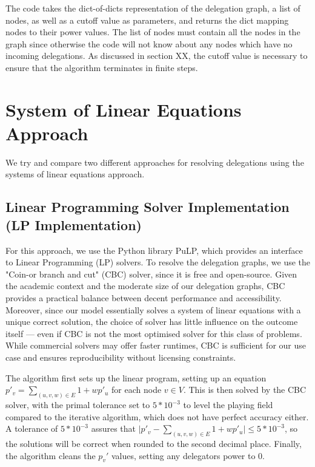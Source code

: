 The code takes the dict-of-dicts representation of the delegation graph, a list of nodes, as well as a cutoff value as parameters, and returns the dict mapping nodes to their power values. The list of nodes must contain all the nodes in the graph since otherwise the code will not know about any nodes which have no incoming delegations. As discussed in section XX, the cutoff value is necessary to ensure that the algorithm terminates in finite steps.

\section{System of Linear Equations Approach}

We try and compare two different approaches for resolving delegations using the systems of linear equations approach.

\subsection{Linear Programming Solver Implementation (LP Implementation)}

For this approach, we use the Python library PuLP, which provides an interface to Linear Programming (LP) solvers.  To resolve the delegation graphs, we use the "Coin-or branch and cut" (CBC) solver, since it is free and open-source. Given the academic context and the moderate size of our delegation graphs, CBC provides a practical balance between decent performance and accessibility. Moreover, since our model essentially solves a system of linear equations with a unique correct solution, the choice of solver has little influence on the outcome itself — even if CBC is not the most optimised solver for this class of problems. While commercial solvers may offer faster runtimes, CBC is sufficient for our use case and ensures reproducibility without licensing constraints.

The algorithm first sets up the linear program, setting up an equation $p'_v = \sum_{(u, v, w) \in E} 1 + wp'_u$ for each node $v \in V$. This is then solved by the CBC solver, with the primal tolerance set to $5*10^{-3}$ to level the playing field compared to the iterative algorithm, which does not have perfect accuracy either. A tolerance of $5 * 10^{-3}$ assures that $\lvert p'_v -\sum_{(u, v, w) \in E} 1 + wp'_u \rvert \le 5*10^{-3}$, so the solutions will be correct when rounded to the second decimal place. Finally, the algorithm cleans the $p_v'$ values, setting any delegators power to 0. 

